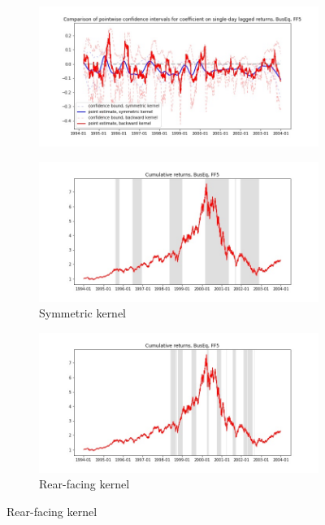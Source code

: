\documentclass{article}
\begin{document}
\newpage

\begin{figure}

\centering

  \begin{subfigure}[b]{\textwidth}
    \includegraphics[width=\textwidth]{BusEq/pointwiseCIs_layered_FF5.jpg}
    \label{fig:1}
  \end{subfigure}
  \begin{subfigure}[b]{0.45\textwidth}
    \includegraphics[width=\textwidth]{BusEq/full_cumrets_ofint_FF5.jpg}
    \caption*{Symmetric kernel}
    \label{fig:2}
  \end{subfigure}
   \begin{subfigure}[b]{0.45\textwidth}
    \includegraphics[width=\textwidth]{BusEq/bwunif_full_cumrets_ofint_FF5.jpg}
    \caption*{Rear-facing kernel}
    \label{fig:2}
  \end{subfigure}
  
\end{figure}
\end{document}
